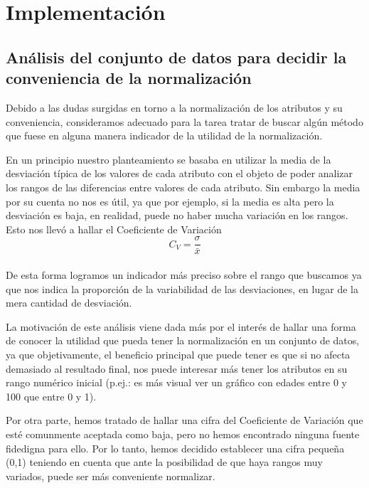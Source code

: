 \documentclass[10pt,a4paper]{article}
\begin{document}
\newpage

\section{Implementación}

\subsection{Análisis del conjunto de datos para decidir la conveniencia de la normalización}
Debido a las dudas surgidas en torno a la normalización de los atributos y su conveniencia, consideramos adecuado para la tarea tratar de buscar algún método que fuese
en alguna manera indicador de la utilidad de la normalización.

En un principio nuestro planteamiento se basaba en utilizar la media de la desviación típica de los valores de cada atributo con el objeto de poder analizar los rangos 
de las diferencias entre valores de cada atributo. Sin embargo la media por su cuenta no nos es útil, ya que por ejemplo, si la media es alta pero la desviación es baja, 
en realidad, puede no haber mucha variación en los rangos. Esto nos llevó a
hallar el Coeficiente de Variación\\

\begin{equation}
C_{V}=\frac{\sigma}{\bar{x}}
 \end{equation}\\

De esta forma logramos un indicador más preciso sobre el rango que buscamos ya que nos indica la proporción de la variabilidad de las desviaciones, en lugar de la mera 
cantidad de desviación.

La motivación de este análisis viene dada más por el interés de hallar una forma de conocer la utilidad que pueda tener la normalización en un conjunto de datos, ya que
 objetivamente, el beneficio principal que puede tener es que si no afecta demasiado al resultado final, nos puede interesar más tener los atributos en su rango numérico inicial (p.ej.: es más visual ver un gráfico con edades entre 0 y 100 que entre 0 y 1).

Por otra parte, hemos tratado de hallar una cifra del Coeficiente de Variación que esté comunmente aceptada como baja, pero no hemos encontrado ninguna fuente fidedigna 
para ello. Por lo tanto, hemos decidido establecer una cifra pequeña (0,1) teniendo en cuenta que ante la posibilidad de que haya rangos muy variados, puede ser más 
conveniente normalizar.
\end{document}
